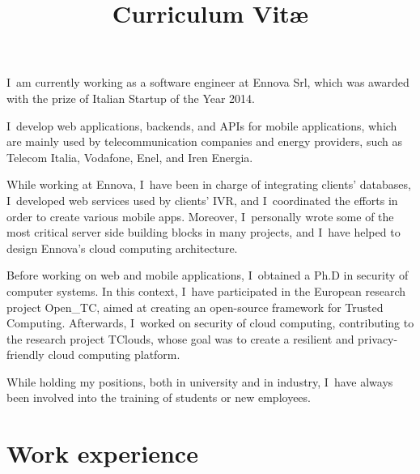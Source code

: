 \documentclass[a4paper,sans]{moderncv} %
\title{Curriculum Vit\ae}
\newcommand{\experience}{Experience}
\newcommand{\otc}{Open\_TC}
\renewcommand{\experience}{Esperienze di lavoro}
\renewcommand{\experience}{Work experience}
\begin{document}
\maketitle

\justify
I~am currently working as a software engineer at Ennova Srl,
  which was awarded with the prize of Italian Startup of the Year 2014.

  I~develop web applications, backends, and APIs for mobile applications,
  which are mainly used by telecommunication companies and energy providers,
  such as Telecom Italia, Vodafone, Enel, and Iren Energia.

  While working at Ennova, I~have been in charge of integrating clients' databases,
  I~developed web services used by clients’ IVR,
  and I~coordinated the efforts in order to create various mobile apps.
  Moreover, I~personally wrote some of the most critical server side building blocks in many projects,
  and I~have helped to design Ennova's cloud computing architecture.

  Before working on web and mobile applications, I~obtained a Ph.D in security of computer systems.
  In this context, I~have participated in the European research project \otc,
  aimed at creating an open-source framework for Trusted Computing.
  Afterwards, I~worked on security of cloud computing, contributing to the research project TClouds,
  whose goal was to create a resilient and privacy-friendly cloud computing platform.

  While holding my positions, both in university and in industry,
  I~have always been involved into the training of students or new employees.

  \section{\experience}

\end{document}
